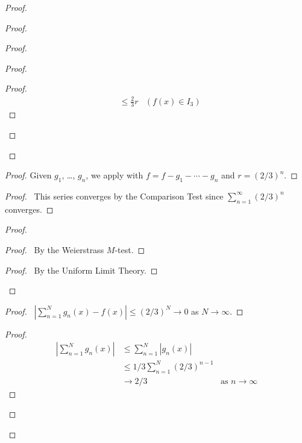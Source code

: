 \begin{proof}
\begin{proof}
\begin{proof}
\begin{proof}
\begin{proof}
\begin{align*}
          & \leq \frac{2}{3} r & (f(x) \in I_3)
        \end{align*}
      \end{proof}
    \end{proof}
  \end{proof}
  \begin{proof}
    \pf Given $g_1$, \ldots, $g_n$, we apply  with $f = f - g_1
- \cdots - g_n$ and $r = (2/3)^n$.
  \end{proof}
  \begin{proof}
    \pf\ This series converges by the Comparison Test since
$\sum_{n=1}^\infty (2/3)^n$ converges.
  \end{proof}
  \begin{proof}
    \begin{proof}
      \pf\ By the Weierstrass $M$-test.
    \end{proof}
    \qedstep
    \begin{proof}
      \pf\ By the Uniform Limit Theory.
    \end{proof}
  \end{proof}
  \begin{proof}
    \pf\ $|\sum_{n=1}^N g_n(x) - f(x)| \leq (2/3)^N \rightarrow 0$ as $N
\rightarrow \infty$.
  \end{proof}
  \begin{proof}
    \pf
    \begin{align*}
      |\sum_{n=1}^N g_n(x)| & \leq \sum_{n=1}^N |g_n(x) | \\
      & \leq 1/3 \sum_{n=1}^N (2/3)^{n-1} \\
      & \rightarrow 2/3 & \text{as } n \rightarrow \infty
    \end{align*}
  \end{proof}
\end{proof}

\end{proof}
